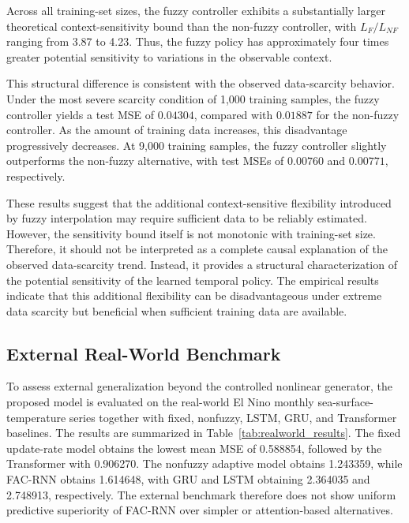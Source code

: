 \documentclass[journal]{IEEEtran}
\begin{document}
	Across all training-set sizes, the fuzzy controller exhibits a substantially larger theoretical context-sensitivity bound than the non-fuzzy controller, with $L_F/L_{NF}$ ranging from 3.87 to 4.23. Thus, the fuzzy policy has approximately four times greater potential sensitivity to variations in the observable context.
	
	This structural difference is consistent with the observed data-scarcity behavior. Under the most severe scarcity condition of 1,000 training samples, the fuzzy controller yields a test MSE of $0.04304$, compared with $0.01887$ for the non-fuzzy controller. As the amount of training data increases, this disadvantage
	progressively decreases. At 9,000 training samples, the fuzzy controller slightly outperforms the non-fuzzy alternative, with test MSEs of $0.00760$ and $0.00771$, respectively.
	
	These results suggest that the additional context-sensitive flexibility introduced by fuzzy interpolation may require sufficient data to be reliably estimated. However, the sensitivity bound itself is not monotonic with training-set size. Therefore, it should not be interpreted as a complete causal explanation of the
	observed data-scarcity trend. Instead, it provides a structural characterization of the potential sensitivity of the learned temporal policy. The empirical results indicate that this additional flexibility can be disadvantageous under extreme data scarcity but beneficial when sufficient training data are available.
	
	
\subsection{External Real-World Benchmark}
\label{subsec:realworld_results}

To assess external generalization beyond the controlled nonlinear generator, the proposed model is evaluated on the real-world El Nino monthly sea-surface-temperature series together with fixed, nonfuzzy, LSTM, GRU, and Transformer baselines. The results are summarized in Table~\ref{tab:realworld_results}. The fixed update-rate model obtains the lowest mean MSE of 0.588854, followed by the Transformer with 0.906270. The nonfuzzy adaptive model obtains 1.243359, while FAC-RNN obtains 1.614648, with GRU and LSTM obtaining 2.364035 and 2.748913, respectively. The external benchmark therefore does not show uniform predictive superiority of FAC-RNN over simpler or attention-based alternatives.
\end{document}
